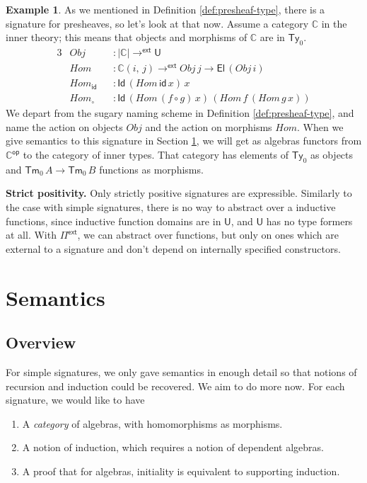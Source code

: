\documentclass[12pt,a4paper,twoside,openany]{book}
\theoremstyle{remark}
\theoremstyle{definition}
\newtheorem{myexample}{Example}
\theoremstyle{theorem}
\newcommand{\mi}[1]{\mathit{#1}}
\newcommand{\ms}[1]{\mathsf{#1}}
\newcommand{\mbb}[1]{\mathbb{#1}}
\newcommand{\id}{\mathsf{id}}
\newcommand{\Tm}{\mathsf{Tm}}
\newcommand{\Ty}{\mathsf{Ty}}
\newcommand{\U}{\mathsf{U}}
\newcommand{\El}{\mathsf{El}}
\newcommand{\Id}{\mathsf{Id}}
\newcommand{\Pie}{\Pi^{\mathsf{ext}}}
\newcommand{\toe}{\to^{\ms{ext}}}
\newcommand{\mbbC}{\mbb{C}}
\begin{document}
\begin{myexample}
\label{ex:presheaf-sig}
As we mentioned in Definition \ref{def:presheaf-type}, there is a signature for
presheaves, so let's look at that now. Assume a category $\mbbC$ in the inner
theory; this means that objects and morphisms of $\mbbC$ are in $\Ty_0$.
\begin{alignat*}{3}
  & \mi{Obj}         &&: |\mbbC| \toe \U\\
  & \mi{Hom}         &&: \mbbC(i,\,j) \toe \mi{Obj}\,j \to \El\,(\mi{Obj}\,i)\\
  & \mi{Hom_{\ms{id}}} &&: \Id\,(\mi{Hom}\,\id\,x)\,x\\
  & \mi{Hom_{\circ}}  &&: \Id\,(\mi{Hom}\,(f \circ g)\,x)\,(\mi{Hom}\,f\,(\mi{Hom}\,g\,x))
\end{alignat*}
We depart from the sugary naming scheme in Definition \ref{def:presheaf-type},
and name the action on objects $\mi{Obj}$ and the action on morphisms
$\mi{Hom}$. When we give semantics to this signature in Section \ref{sec:fqiit-semantics}, we
will get as algebras functors from $\mbbC^{\ms{op}}$ to the category of inner
types. That category has elements of $\Ty_0$ as objects and $\Tm_0\,A \to
\Tm_0\,B$ functions as morphisms.
\end{myexample}

\textbf{Strict positivity.} Only strictly positive signatures are expressible.
Similarly to the case with simple signatures, there is no way to abstract over a
inductive functions, since inductive function domains are in $\U$, and $\U$ has
no type formers at all. With $\Pie$, we can abstract over functions, but only on
ones which are external to a signature and don't depend on internally specified
constructors.

\section{Semantics}
\label{sec:fqiit-semantics}

\subsection{Overview}

For simple signatures, we only gave semantics in enough detail so that notions
of recursion and induction could be recovered. We aim to do more now. For each
signature, we would like to have
\begin{enumerate}
  \item A \emph{category} of algebras, with homomorphisms as morphisms.
  \item A notion of induction, which requires a notion of dependent algebras.
  \item A proof that for algebras, initiality is equivalent to supporting induction.
\end{enumerate}
\end{document}
